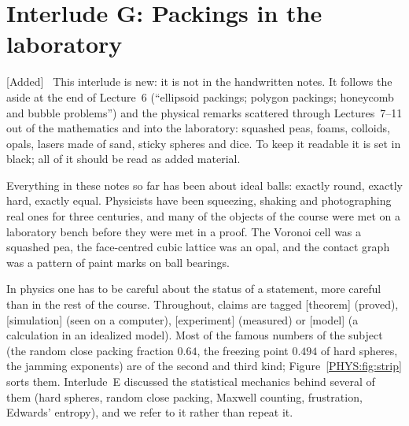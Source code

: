 \documentclass[11pt,openany]{book}
\theoremstyle{plain}
\theoremstyle{definition}
\theoremstyle{remark}
\newenvironment{addedblock}{\par\color{addcol}\noindent\textsf{\small[Added]}\ }{\par}
\begin{document}
\newcommand{\PHYStag}[1]{\textsf{\scriptsize[#1]}}
\newcommand{\PHYSmth}[1]{\fill[black] #1 ++(-2.2pt,-2.2pt) rectangle ++(4.4pt,4.4pt);}
\newcommand{\PHYSmsim}[1]{\filldraw[draw=black,fill=white,thick] #1 circle (2.3pt);}
\newcommand{\PHYSmexp}[1]{\fill[flagcol] #1 ++(0pt,3.2pt) -- ++(-2.9pt,-5.2pt) -- ++(5.8pt,0pt) -- cycle;}
\newcommand{\PHYSmcon}[1]{\fill[addcol] #1 ++(0pt,3pt) -- ++(3pt,-3pt) -- ++(-3pt,-3pt) -- ++(-3pt,3pt) -- cycle;}

\chapter[Interlude G: Packings in the lab]{Interlude G: Packings in the laboratory}
\label{PHYS:ch}

\begin{addedblock}
This interlude is new: it is not in the handwritten notes. It follows the aside at the end of
Lecture~6 (``ellipsoid packings; polygon packings; honeycomb and bubble problems'') and the physical
remarks scattered through Lectures~7--11 out of the mathematics and into the laboratory: squashed peas,
foams, colloids, opals, lasers made of sand, sticky spheres and dice. To keep it readable it is set in
black; all of it should be read as added material.
\end{addedblock}

Everything in these notes so far has been about ideal balls: exactly round, exactly hard, exactly
equal. Physicists have been squeezing, shaking and photographing real ones for three centuries, and
many of the objects of the course were met on a laboratory bench before they were met in a proof. The
Voronoi cell was a squashed pea, the face-centred cubic lattice was an opal, and the contact graph was
a pattern of paint marks on ball bearings.

In physics one has to be careful about the status of a statement, more careful than in the rest of the
course. Throughout, claims are tagged \PHYStag{theorem} (proved), \PHYStag{simulation} (seen on a
computer), \PHYStag{experiment} (measured) or \PHYStag{model} (a calculation in an idealized model).
Most of the famous numbers of the subject (the random close packing fraction $0.64$, the freezing
point $0.494$ of hard spheres, the jamming exponents) are of the second and third kind; Figure~\ref{PHYS:fig:strip} sorts them. Interlude~E
discussed the statistical mechanics behind several of them (hard spheres, random close packing, Maxwell
counting, frustration, Edwards' entropy), and we refer to it rather than repeat it.
\end{document}
